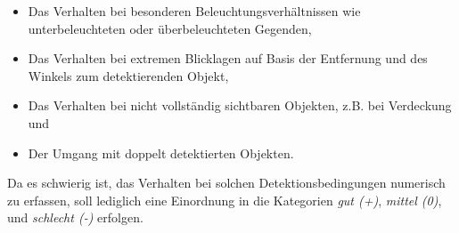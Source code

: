 \begin{itemize}
	\item Das Verhalten bei besonderen Beleuchtungsverhältnissen wie unterbeleuchteten oder überbeleuchteten Gegenden, 
	\item Das Verhalten bei extremen Blicklagen auf Basis der Entfernung und des Winkels zum detektierenden Objekt,
	\item Das Verhalten bei nicht vollständig sichtbaren Objekten, z.B. bei Verdeckung und
	\item Der Umgang mit doppelt detektierten Objekten. 
\end{itemize}

Da es schwierig ist, das Verhalten bei solchen Detektionsbedingungen numerisch zu erfassen, soll lediglich eine Einordnung in die Kategorien \textit{gut (+)}, \textit{mittel (0)}, und \textit{schlecht (-)} erfolgen.

